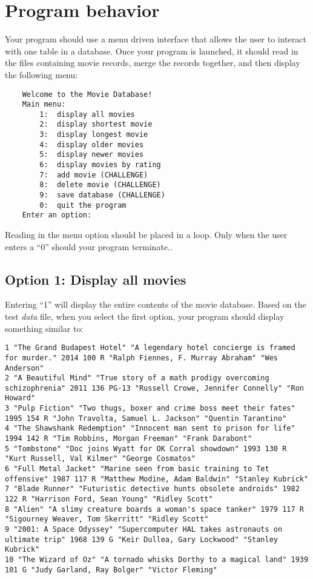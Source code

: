 \documentclass{article}
\begin{document}
\section*{Program behavior}

Your program should use a menu driven interface that allows the user
to interact with one table in a database.  Once your program is launched,
it should read in the files containing movie records, merge the records together,
and then display the following menu:

\begin{verbatim}
    Welcome to the Movie Database!
    Main menu: 
        1:  display all movies
        2:  display shortest movie
        3:  display longest movie
        4:  display older movies
        5:  display newer movies
        6:  display movies by rating
        7:  add movie (CHALLENGE)
        8:  delete movie (CHALLENGE)
        9:  save database (CHALLENGE)
        0:  quit the program
    Enter an option:
\end{verbatim}

Reading in the menu option should be placed in
a loop. Only when the user enters a ``0'' should your program terminate..

\subsection*{Option 1: Display all movies}

Entering ``1'' will display the entire contents of the movie database.
Based on the test {\it data} file, when you select the first option,
your program should display something similar to:

{\scriptsize
\begin{verbatim}
1 "The Grand Budapest Hotel" "A legendary hotel concierge is framed for murder." 2014 100 R "Ralph Fiennes, F. Murray Abraham" "Wes Anderson" 
2 "A Beautiful Mind" "True story of a math prodigy overcoming schizophrenia" 2011 136 PG-13 "Russell Crowe, Jennifer Connelly" "Ron Howard"
3 "Pulp Fiction" "Two thugs, boxer and crime boss meet their fates" 1995 154 R "John Travolta, Samuel L. Jackson" "Quentin Tarantino"
4 "The Shawshank Redemption" "Innocent man sent to prison for life" 1994 142 R "Tim Robbins, Morgan Freeman" "Frank Darabont"
5 "Tombstone" "Doc joins Wyatt for OK Corral showdown" 1993 130 R "Kurt Russell, Val Kilmer" "George Cosmatos"
6 "Full Metal Jacket" "Marine seen from basic training to Tet offensive" 1987 117 R "Matthew Modine, Adam Baldwin" "Stanley Kubrick"
7 "Blade Runner" "Futuristic detective hunts obsolete androids" 1982 122 R "Harrison Ford, Sean Young" "Ridley Scott"
8 "Alien" "A slimy creature boards a woman's space tanker" 1979 117 R "Sigourney Weaver, Tom Skerritt" "Ridley Scott"
9 "2001: A Space Odyssey" "Supercomputer HAL takes astronauts on ultimate trip" 1968 139 G "Keir Dullea, Gary Lockwood" "Stanley Kubrick"
10 "The Wizard of Oz" "A tornado whisks Dorthy to a magical land" 1939 101 G "Judy Garland, Ray Bolger" "Victor Fleming"
\end{verbatim}
}
\end{document}
